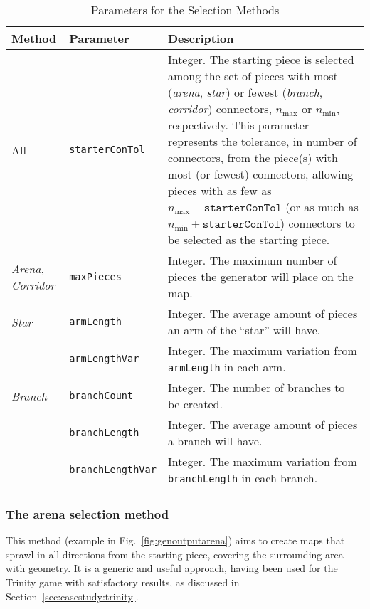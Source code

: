 \documentclass[journal]{IEEEtran}
\begin{document}
\begin{table*}[!t]
  \caption{Parameters for the Selection Methods}
  \label{tab:smparams}
  \begin{tabular}{llp{12.7cm}}
  \toprule
    Method & Parameter & Description \\
  \midrule
      All
      & \texttt{starterConTol}
        & Integer. The starting piece is selected among the set of pieces with most
          (\textit{arena}, \textit{star}) or fewest (\textit{branch}, \textit{corridor})
          connectors, $n_\text{max}$ or $n_\text{min}$, respectively. This parameter
          represents the tolerance, in number of connectors, from the piece(s) with
          most (or fewest) connectors, allowing pieces with as few as
          $n_\text{max}-\texttt{starterConTol}$ (or as much as
          $n_\text{min}+\texttt{starterConTol}$) connectors to be selected
          as the starting piece.\\
  \hdashline[.5pt/1pt]
    \emph{Arena}, \emph{Corridor}
    & \texttt{maxPieces}
      & Integer. The maximum number of pieces the generator will place on the map.\\
  \hdashline[.5pt/1pt]
      \emph{Star}
      & \texttt{armLength}
        & Integer. The average amount of pieces an arm of the ``star'' will have.\\
      & \texttt{armLengthVar}
        & Integer. The maximum variation from \texttt{armLength} in each arm.\\
  \hdashline[.5pt/1pt]
      \emph{Branch}
      & \texttt{branchCount}
        & Integer. The number of branches to be created. \\
      & \texttt{branchLength}
        & Integer. The average amount of pieces a branch will have.\\
      & \texttt{branchLengthVar}
        & Integer. The maximum variation from \texttt{branchLength} in each branch.\\
  \bottomrule
  \end{tabular}
\end{table*}

\subsubsection{The arena selection method}
\label{sec:methods:selmethods:arena}

This method (example in Fig.~\ref{fig:genoutputarena}) aims to create maps that sprawl
in all directions from the starting piece, covering the surrounding area with geometry.
It is a generic and useful approach, having been used for the Trinity game with
satisfactory results, as discussed in Section~\ref{sec:casestudy:trinity}.
\end{document}
